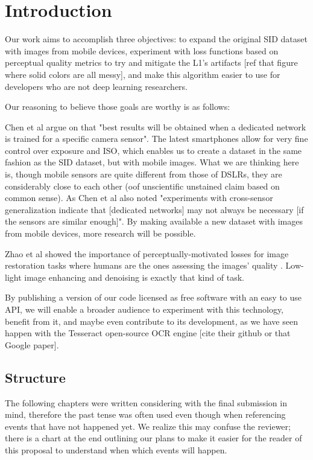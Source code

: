 \chapter{Introduction}
Our work aims to accomplish three objectives: to expand the original SID dataset with images from mobile devices, experiment with loss functions based on perceptual quality metrics to try and mitigate the L1's artifacts [ref that figure where solid colors are all messy], and make this algorithm easier to use for developers who are not deep learning researchers.

Our reasoning to believe those goals are worthy is as follows: 

Chen et al argue on \cite{DBLP:conf/cvpr/ChenCXK18} that "best results will be obtained when a dedicated network is trained for a specific camera sensor".
The latest smartphones allow for very fine control over exposure and ISO, which enables us to create a dataset in the same fashion as the SID dataset, but with mobile images.
What we are thinking here is, though mobile sensors are quite different from those of DSLRs, they are considerably close to each other (oof unscientific unstained claim based on common sense).
As Chen et al also noted "experiments with cross-sensor generalization indicate that [dedicated networks] may not always be necessary [if the sensors are similar enough]".
By making available a new dataset with images from mobile devices, more research will be possible.

Zhao et al showed the importance of perceptually-motivated losses for image restoration tasks where humans are the ones assessing the images' quality \cite{DBLP:journals/tci/ZhaoGFK17}.
Low-light image enhancing and denoising is exactly that kind of task.

By publishing a version of our code licensed as free software with an easy to use API, we will enable a broader audience to experiment with this technology, benefit from it, and maybe even contribute to its development, as we have seen happen with the Tesseract open-source OCR engine [cite their github or that Google paper].

\section{Structure}
The following chapters were written considering with the final submission in mind, therefore the past tense was often used even though when referencing events that have not happened yet.
We realize this may confuse the reviewer; there is a chart at the end outlining our plans to make it easier for the reader of this proposal to understand when which events will happen.


